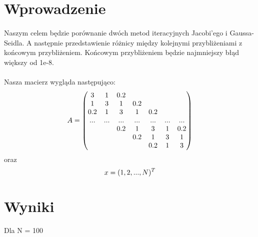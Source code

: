 \documentclass{article}
\begin{document}
\section{Wprowadzenie}

\paragraph{}
Naszym celem będzie porównanie dwóch metod iteracyjnych Jacobi'ego i Gaussa-Seidla.
A następnie przedstawienie różnicy między kolejnymi przybliżeniami z końcowym przybliżeniem.
Końcowym przybliżeniem będzie najmniejszy błąd większy od 1e-8.


\paragraph{}
Nasza macierz wygląda następująco: \\
\begin{equation*}
 \medskip
 A = \begin{pmatrix}
    3 & 1 & 0.2\\ 
    1 & 3 & 1 & 0.2 \\ 
    0.2 & 1 & 3 & 1 & 0.2 \\ 
    ... & ... & ... & ... & ... & ... & ...  \\
     &&0.2& 1 & 3 & 1 & 0.2 \\ 
     && &0.2 & 1  & 3 & 1 \\
    &&&&0.2&1&3
    \end{pmatrix}
\end{equation*}
oraz
\begin{equation*}
 x = (1, 2,...,N)^T \\
\end{equation*}
\section{Wyniki}


Dla N = 100
\end{document}
